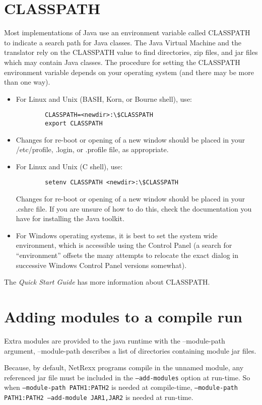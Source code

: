 \section{CLASSPATH}
Most implementations of Java use an environment variable called
CLASSPATH to indicate a search path for Java classes. The Java Virtual
Machine and the \nr{} translator rely on the CLASSPATH value to find directories, zip files, and jar files which may contain Java classes. 
The procedure for setting the CLASSPATH environment variable depends on your operating system (and there may be more than one way).
\begin{itemize}
\item For Linux and Unix (BASH, Korn, or Bourne shell), use:
\begin{verbatim}
        CLASSPATH=<newdir>:\$CLASSPATH 
        export CLASSPATH
\end{verbatim}

\item Changes for re-boot or opening of a new window should be placed in your /etc/profile, .login, or .profile file, as appropriate. 
\item For Linux and Unix (C shell), use:
\begin{verbatim}
        setenv CLASSPATH <newdir>:\$CLASSPATH 
\end{verbatim}
Changes for re-boot or opening of a new window should be placed in
your .cshrc file. If you are unsure of how to do this, check the
documentation you have for installing the Java toolkit.
\item For Windows operating systems, it is best to set the system wide
  environment, which is accessible using the Control Panel (a search
  for ``environment'' offsets the many attempts to relocate the exact
  dialog in successive Windows Control Panel versions somewhat).
\end{itemize}
The \emph{Quick Start Guide} has more information about CLASSPATH.

\section{Adding modules to a compile run}
Extra modules are provided to the java runtime with the --module-path argument, --module-path describes a list of directories containing module jar files.

Because, by default, NetRexx programs compile in the unnamed module, any referenced jar file must be included in the \texttt{--add-modules} option at run-time.
So when \texttt{--module-path PATH1:PATH2} is needed at compile-time, \texttt{--module-path PATH1:PATH2 --add-module JAR1,JAR2} is needed at run-time.

